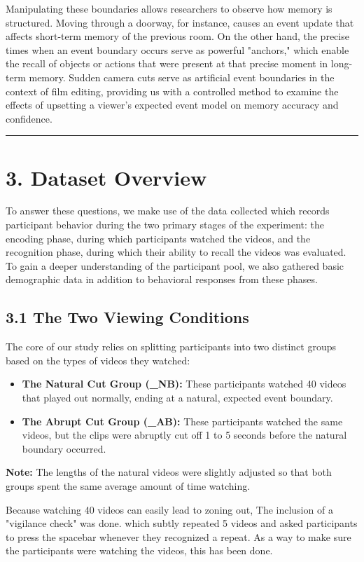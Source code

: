 \documentclass[10pt,a4paper]{article}
\begin{document}
Manipulating these boundaries allows researchers to observe how memory is structured. Moving through a doorway, for instance, causes an event update that affects short-term memory of the previous room. On the other hand, the precise times when an event boundary occurs serve as powerful "anchors," which enable the recall of objects or actions that were present at that precise moment in long-term memory. Sudden camera cuts serve as artificial event boundaries in the context of film editing, providing us with a controlled method to examine the effects of upsetting a viewer's expected event model on memory accuracy and confidence.

\rule{\linewidth}{0.4pt}

\section{3. Dataset Overview}
To answer these questions, we make use of the data collected which records participant behavior during the two primary stages of the experiment: the encoding phase, during which participants watched the videos, and the recognition phase, during which their ability to recall the videos was evaluated. To gain a deeper understanding of the participant pool, we also gathered basic demographic data in addition to behavioral responses from these phases.

\subsection{3.1 The Two Viewing Conditions}
The core of our study relies on splitting participants into two distinct groups based on the types of videos they watched:
\begin{itemize}
    \item \textbf{The Natural Cut Group (\_NB):} These participants watched 40 videos that played out normally, ending at a natural, expected event boundary.
    \item \textbf{The Abrupt Cut Group (\_AB):} These participants watched the same videos, but the clips were abruptly cut off 1 to 5 seconds before the natural boundary occurred. 
\end{itemize}

\textbf{Note:} The lengths of the natural videos were slightly adjusted so that both groups spent the same average amount of time watching.

Because watching 40 videos can easily lead to zoning out, The inclusion of a "vigilance check" was done. which subtly repeated 5 videos and asked participants to press the spacebar whenever they recognized a repeat. As a way to make sure the participants were watching the videos, this has been done.
\end{document}
